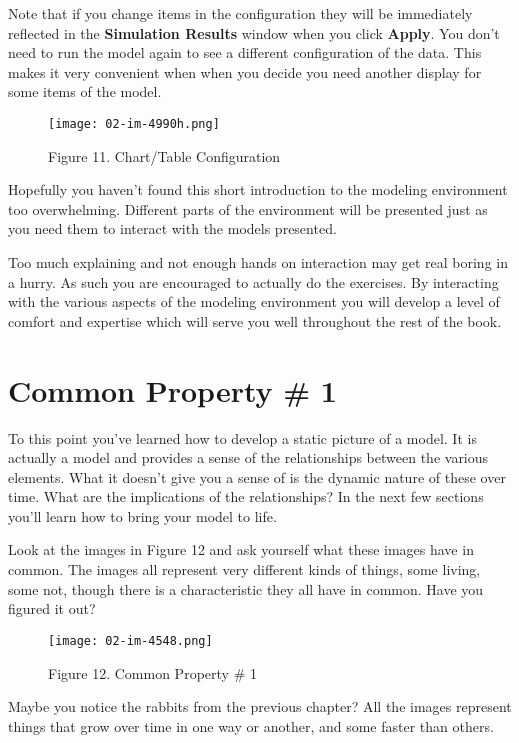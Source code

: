 \documentclass[]{memoir}
\let\Oldincludegraphics\includegraphics
\renewcommand{\includegraphics}[1]{\Oldincludegraphics[max size={\textwidth}{\textheight}]{#1}}
\renewcommand{\u}[1]{\textbf{#1}}
\begin{document}
Note that if you change items in the configuration they will be
immediately reflected in the \u{Simulation Results} window when you
click \u{Apply}. You don't need to run the model again to see a
different configuration of the data. This makes it very convenient when
when you decide you need another display for some items of the model.

\begin{figure}[htbp]
\centering
\texttt{[image: 02-im-4990h.png]}
\caption{Figure 11. Chart/Table Configuration}
\end{figure}

Hopefully you haven't found this short introduction to the modeling
environment too overwhelming. Different parts of the environment will be
presented just as you need them to interact with the models presented.

Too much explaining and not enough hands on interaction may get real
boring in a hurry. As such you are encouraged to actually do the
exercises. By interacting with the various aspects of the modeling
environment you will develop a level of comfort and expertise which will
serve you well throughout the rest of the book.

\section{Common Property \# 1}

To this point you've learned how to develop a static picture of a model.
It is actually a model and provides a sense of the relationships between
the various elements. What it doesn't give you a sense of is the dynamic
nature of these over time. What are the implications of the
relationships? In the next few sections you'll learn how to bring your
model to life.

Look at the images in Figure 12 and ask yourself what these images have
in common. The images all represent very different kinds of things, some
living, some not, though there is a characteristic they all have in
common. Have you figured it out?

\begin{figure}[htbp]
\centering
\texttt{[image: 02-im-4548.png]}
\caption{Figure 12. Common Property \# 1}
\end{figure}

Maybe you notice the rabbits from the previous chapter? All the images
represent things that grow over time in one way or another, and some
faster than others.
\end{document}
